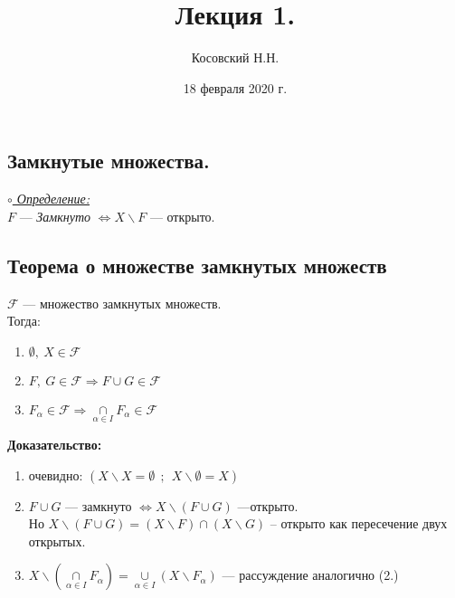 \documentclass{article}
\title{Лекция 1.}
\author{Косовский Н.Н.}
\date{18 февраля 2020 г.}
\begin{document}
\begin{spacing}{1.5}
\maketitle
\newpage
     
    \tableofcontents
    \newpage

\section{Замкнутые множества.}
\underline{\textit{$\circ$ Определение:}}\\
$F$ --- \emph{Замкнуто} $\Longleftrightarrow X\backslash F$ --- открыто.
\subsection{Теорема о множестве замкнутых множеств}
$ \mathcal{F} $ --- множество замкнутых множеств.
\\Тогда:
\begin{enumerate}
\item $\emptyset ,~X\in \mathcal{F}$
\item $F,~G\in \mathcal{F} \Rightarrow F\cup G\in \mathcal{F}$
\item $F_{\alpha}\in \mathcal{F} \Rightarrow \underset{\alpha\in I}{\cap}F_{\alpha}\in \mathcal{F}$
\end{enumerate}
 \textbf{Доказательство:}
 \begin{enumerate}
 	\item очевидно: $(X\backslash X = \emptyset~~;~~X\backslash \emptyset = X)$
 	\item $F\cup G$ --- замкнуто $\Longleftrightarrow X\backslash (F\cup G)$ ---открыто.\\
 	Но $X\backslash (F\cup G) = (X\backslash F)\cap(X\backslash G)$ -- открыто как пересечение двух открытых.
 	\item $X\backslash(\underset{\alpha\in I}{\cap}F_{\alpha}) = \underset{\alpha\in I}{\cup}(X\backslash F_{\alpha})$ --- рассуждение аналогично (2.)

\end{enumerate}

\end{spacing}
\end{document}

